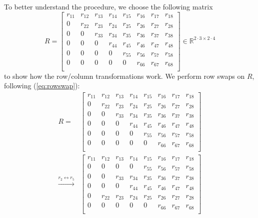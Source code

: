 \documentclass[conference]{IEEEtran}
\numberwithin{equation}{section}
\begin{document}
To better understand the procedure, we choose the following matrix 
\[R= \begin{bmatrix}
 r_{11} & r_{12} & r_{13} & r_{14} & r_{15} & r_{16} & r_{17} & r_{18}\\
 0      & r_{22} & r_{23} & r_{24} & r_{25} & r_{26} & r_{27} & r_{28}\\
 0      & 0      & r_{33} & r_{34} & r_{35} & r_{36} & r_{37} & r_{38}\\
 0      & 0      & 0      & r_{44} & r_{45} & r_{46} & r_{47} & r_{48}\\
 0      & 0      & 0      & 0      & r_{55} & r_{56} & r_{57} & r_{58}\\
 0      & 0      & 0      & 0      & 0      & r_{66} & r_{67} & r_{68}\\
\end{bmatrix} \in \mathbb{R}^{2\cdot 3 \times 2 \cdot 4}
\]
to show how the row/column transformations work. We perform row swaps on $R$, following (\ref{eq:rowswap}):
\begin{align*}
R =
  &\begin{bmatrix}
 r_{11} & r_{12} & r_{13} & r_{14} & r_{15} & r_{16} & r_{17} & r_{18}\\
 0      & r_{22} & r_{23} & r_{24} & r_{25} & r_{26} & r_{27} & r_{28}\\
 0      & 0      & r_{33} & r_{34} & r_{35} & r_{36} & r_{37} & r_{38}\\
 0      & 0      & 0      & r_{44} & r_{45} & r_{46} & r_{47} & r_{48}\\
 0      & 0      & 0      & 0      & r_{55} & r_{56} & r_{57} & r_{58}\\
 0      & 0      & 0      & 0      & 0      & r_{66} & r_{67} & r_{68}\\
\end{bmatrix} \\
\xrightarrow{r_{2} \leftrightarrow r_{5}}
&\begin{bmatrix}
 r_{11} & r_{12} & r_{13} & r_{14} & r_{15} & r_{16} & r_{17} & r_{18}\\
 0      & 0      & 0      & 0      & r_{55} & r_{56} & r_{57} & r_{58}\\
 0      & 0      & r_{33} & r_{34} & r_{35} & r_{36} & r_{37} & r_{38}\\
 0      & 0      & 0      & r_{44} & r_{45} & r_{46} & r_{47} & r_{48}\\
 0      & r_{22} & r_{23} & r_{24} & r_{25} & r_{26} & r_{27} & r_{28}\\
 0      & 0      & 0      & 0      & 0      & r_{66} & r_{67} & r_{68}\\
\end{bmatrix}
\end{align*}\\
\end{document}
